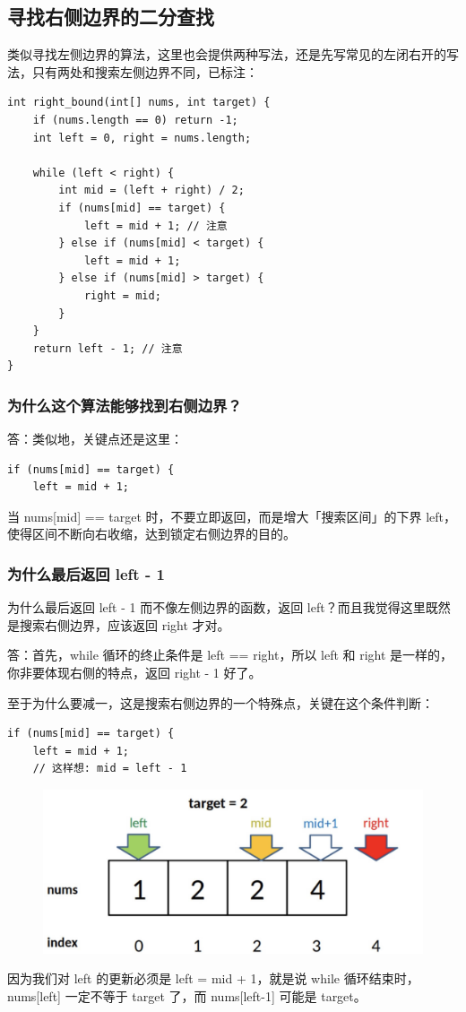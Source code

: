 \documentclass[12pt]{article}
\begin{document}
\subsection{寻找右侧边界的二分查找}
类似寻找左侧边界的算法，这里也会提供两种写法，还是先写常见的左闭右开的写法，只有两处和搜索左侧边界不同，已标注：
\begin{lstlisting}
int right_bound(int[] nums, int target) {
    if (nums.length == 0) return -1;
    int left = 0, right = nums.length;
    
    while (left < right) {
        int mid = (left + right) / 2;
        if (nums[mid] == target) {
            left = mid + 1; // 注意
        } else if (nums[mid] < target) {
            left = mid + 1;
        } else if (nums[mid] > target) {
            right = mid;
        }
    }
    return left - 1; // 注意
}
\end{lstlisting}

\subsubsection{为什么这个算法能够找到右侧边界？}
答：类似地，关键点还是这里：
\begin{lstlisting}
if (nums[mid] == target) {
    left = mid + 1;
\end{lstlisting}

当 nums[mid] == target 时，不要立即返回，而是增大「搜索区间」的下界 left，使得区间不断向右收缩，达到锁定右侧边界的目的。

\subsubsection{为什么最后返回 left - 1}
为什么最后返回 left - 1 而不像左侧边界的函数，返回 left？而且我觉得这里既然是搜索右侧边界，应该返回 right 才对。

答：首先，while 循环的终止条件是 left == right，所以 left 和 right 是一样的，你非要体现右侧的特点，返回 right - 1 好了。

至于为什么要减一，这是搜索右侧边界的一个特殊点，关键在这个条件判断：
\begin{lstlisting}
if (nums[mid] == target) {
    left = mid + 1;
    // 这样想: mid = left - 1
\end{lstlisting}
\begin{figure}[H]
    \centering
    \includegraphics[width=1\textwidth]{fig/Binary_Search_3.png}
\end{figure}
因为我们对 left 的更新必须是 left = mid + 1，就是说 while 循环结束时，nums[left] 一定不等于 target 了，而 nums[left-1] 可能是 target。
\end{document}
